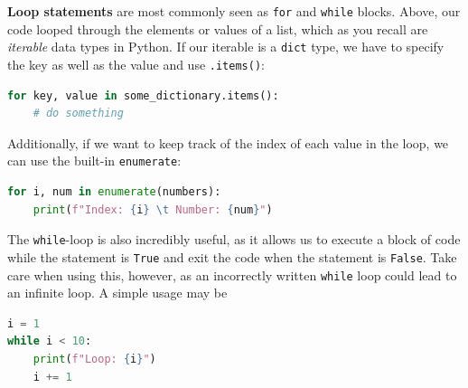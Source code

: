 \documentclass{tufte-book}
\begin{document}


\textbf{Loop statements} are most commonly seen as \verb|for| and \verb|while| blocks. Above, our code looped through the elements or values of a list, which as you recall are \textit{iterable} data types in Python. If our iterable is a \verb|dict| type, we have to specify the key as well as the value and use \verb|.items()|:

\begin{lstlisting}[language=Python, showstringspaces=false,
backgroundcolor=\color{lightgray}]
for key, value in some_dictionary.items():
    # do something
\end{lstlisting}

Additionally, if we want to keep track of the index of each value in the loop, we can use the built-in \verb|enumerate|:

\begin{lstlisting}[language=Python, showstringspaces=false,
backgroundcolor=\color{lightgray}]
for i, num in enumerate(numbers):
    print(f"Index: {i} \t Number: {num}")
\end{lstlisting}

The \verb|while|-loop is also incredibly useful, as it allows us to execute a block of code while the statement is \verb|True| and exit the code when the statement is \verb|False|. Take care when using this, however, as an incorrectly written \verb|while| loop could lead to an infinite loop. A simple usage may be

\begin{lstlisting}[language=Python, showstringspaces=false,
backgroundcolor=\color{lightgray}]
i = 1
while i < 10:
    print(f"Loop: {i}")
    i += 1
\end{lstlisting}
\end{document}
